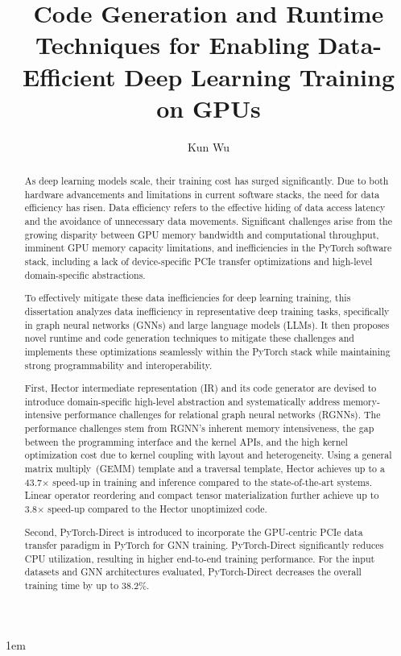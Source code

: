 \documentclass[edeposit,tocnosub,noragright,centerchapter,12pt]{uiucecethesis09}
\title{Code Generation and Runtime Techniques for Enabling Data-Efficient Deep Learning Training on GPUs}
\author{Kun Wu}
\newcommand{\kwc}[1]{{#1}}
\newcommand{\kwc}[1]{{\color{blue}#1}}
\begin{document}
\maketitle

\parindent 1em%

\frontmatter

\setcounter{page}{2}



\begin{abstract}

As deep learning models scale, their training cost has surged significantly. Due to both hardware advancements and limitations in current software stacks, the need for data efficiency has risen. Data efficiency refers to the effective hiding of data access latency and the avoidance of unnecessary data movements. Significant challenges arise from the growing disparity between GPU memory bandwidth and computational throughput, imminent GPU memory capacity limitations, and inefficiencies in the PyTorch software stack, including a lack of device-specific PCIe transfer optimizations and high-level domain-specific abstractions.

To effectively mitigate these data inefficiencies for deep learning training, this dissertation analyzes data inefficiency in representative deep training tasks, specifically in graph neural networks (GNNs) and large language models (LLMs). It then proposes novel runtime and code generation techniques to mitigate these challenges and implements these optimizations seamlessly within the PyTorch stack while maintaining strong programmability and interoperability.


First, Hector intermediate representation (IR) and its code generator are \kwc{devised} to introduce domain-specific high-level abstraction and systematically address memory-intensive performance challenges for relational graph neural networks (RGNNs). The performance challenges stem from RGNN's inherent memory intensiveness, the gap between the programming interface and the kernel APIs, and the high kernel optimization cost due to kernel coupling with layout and heterogeneity. Using a general matrix multiply~(GEMM) template and a traversal template, Hector achieves up to a 43.7$\times$ speed-up in training and inference compared to the state-of-the-art systems. Linear operator reordering and compact tensor materialization further achieve up to 3.8$\times$ speed-up compared to the Hector unoptimized code.

Second, PyTorch-Direct is introduced to incorporate the GPU-centric PCIe data transfer paradigm in PyTorch for GNN training. PyTorch-Direct significantly reduces CPU utilization, resulting in higher end-to-end training performance. For the input datasets and GNN architectures evaluated, PyTorch-Direct decreases the overall training time by up to 38.2\%.


\end{abstract}
\end{document}
